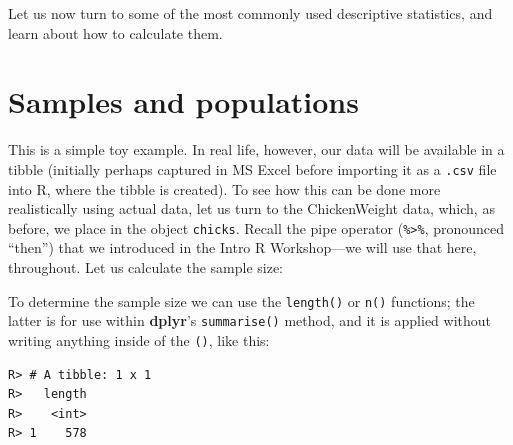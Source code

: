 \documentclass[english,10pt,a4paper,oneside]{book}
\newenvironment{Shaded}{\begin{snugshade}}{\end{snugshade}}
\newcommand{\KeywordTok}[1]{\textcolor[rgb]{0.13,0.29,0.53}{\textbf{#1}}}
\newcommand{\DataTypeTok}[1]{\textcolor[rgb]{0.13,0.29,0.53}{#1}}
\newcommand{\StringTok}[1]{\textcolor[rgb]{0.31,0.60,0.02}{#1}}
\newcommand{\CommentTok}[1]{\textcolor[rgb]{0.56,0.35,0.01}{\textit{#1}}}
\newcommand{\OperatorTok}[1]{\textcolor[rgb]{0.81,0.36,0.00}{\textbf{#1}}}
\newcommand{\NormalTok}[1]{#1}
\theoremstyle{definition}
\theoremstyle{definition}
\theoremstyle{definition}
\theoremstyle{remark}
\begin{document}
Let us now turn to some of the most commonly used descriptive
statistics, and learn about how to calculate them.

\section{Samples and populations}\label{samples-and-populations}

This is a simple toy example. In real life, however, our data will be
available in a tibble (initially perhaps captured in MS Excel before
importing it as a \texttt{.csv} file into R, where the tibble is
created). To see how this can be done more realistically using actual
data, let us turn to the ChickenWeight data, which, as before, we place
in the object \texttt{chicks}. Recall the pipe operator
(\texttt{\%\textgreater{}\%}, pronounced \enquote{then}) that we
introduced in the Intro R Workshop---we will use that here, throughout.
Let us calculate the sample size:

To determine the sample size we can use the \texttt{length()} or
\texttt{n()} functions; the latter is for use within \textbf{dplyr}'s
\texttt{summarise()} method, and it is applied without writing anything
inside of the \texttt{()}, like this:

\begin{Shaded}
\end{Shaded}

\begin{verbatim}
R> # A tibble: 1 x 1
R>   length
R>    <int>
R> 1    578
\end{verbatim}

\begin{Shaded}
\end{Shaded}
\end{document}
